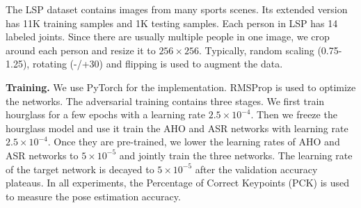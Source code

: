 \documentclass[10pt,twocolumn,letterpaper]{article}
\begin{document}
The LSP dataset contains images from many sports scenes. Its extended version has 11K training samples and 1K testing samples. Each person in LSP has 14 labeled joints. Since there are usually multiple people in one image, we crop around each person and resize it to $256\times 256$. Typically, random scaling (0.75-1.25), rotating (-/+30\textdegree) and flipping is used to augment the data.

{\bf Training.} We use PyTorch for the implementation. RMSProp \cite{tieleman2012rmsprop} is used to optimize the networks. The adversarial training contains three stages. We first train hourglass for a few epochs with a learning rate $2.5\times 10^{-4}$. Then we freeze the hourglass model and use it train the AHO and ASR networks with learning rate $2.5\times 10^{-4}$. Once they are pre-trained, we lower the learning rates of AHO and ASR networks to $5\times 10^{-5}$ and jointly train the three networks. The learning rate of the target network is decayed to $5\times 10^{-5}$ after the validation accuracy plateaus. In all experiments, the Percentage of Correct Keypoints (PCK) \cite{yang2011articulated} is used to measure the pose estimation accuracy.
\end{document}
